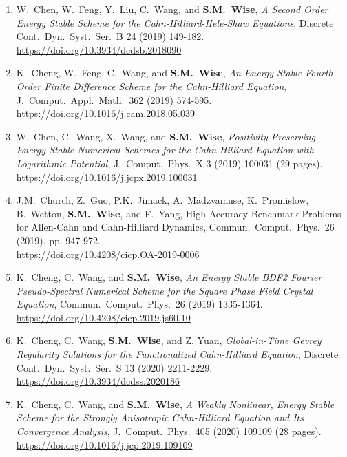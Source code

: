 \documentclass[11pt]{letter}
\begin{document}
\begin{enumerate}
	\item
W.~Chen, W.~Feng, Y.~Liu, C.~Wang, and \textbf{S.M.~Wise}, {\sl A Second Order Energy Stable Scheme for the Cahn-Hilliard-Hele-Shaw Equations}, Discrete Cont.~Dyn.~Syst.~Ser.~B 24 (2019) 149-182.
	\\ 
\url{https://doi.org/10.3934/dcdsb.2018090}

		\item
K.~Cheng, W.~Feng, C.~Wang, and \textbf{S.M.~Wise}, {\sl An Energy Stable Fourth Order Finite Difference Scheme for the Cahn-Hilliard Equation}, J.~Comput.~Appl.~Math.~362 (2019) 574-595.
	\\ 
\url{https://doi.org/10.1016/j.cam.2018.05.039}

    \item
W.~Chen, C.~Wang, X.~Wang, and \textbf{S.M.~Wise}, {\sl Positivity-Preserving, Energy Stable Numerical Schemes for the Cahn-Hilliard Equation with Logarithmic Potential}, J.~Comput.~Phys.~X 3 (2019) 100031 (29 pages).
	\\ 
\url{https://doi.org/10.1016/j.jcpx.2019.100031}

	\item
J.M.~Church, Z.~Guo, P.K.~Jimack, A.~Madzvamuse, K.~Promislow, B.~Wetton, \textbf{S.M.~Wise}, and F.~Yang, {High Accuracy Benchmark Problems for Allen-Cahn and Cahn-Hilliard Dynamics},  Commun.~Comput.~Phys.~26 (2019), pp. 947-972.
	\\ 
\url{https://doi.org/10.4208/cicp.OA-2019-0006}

	\item
K.~Cheng, C.~Wang, and \textbf{S.M.~Wise}, {\sl An Energy Stable BDF2 Fourier Pseudo-Spectral Numerical Scheme for the Square Phase Field Crystal Equation}, Commun.~Comput.~Phys.~26 (2019) 1335-1364.
	\\ 
\url{https://doi.org/10.4208/cicp.2019.js60.10}

	\item
K.~Cheng, C.~Wang, \textbf{S.M.~Wise}, and Z. Yuan, {\sl Global-in-Time Gevrey Regularity Solutions for the Functionalized Cahn-Hilliard Equation}, Discrete Cont.~Dyn.~Syst.~Ser.~S 13 (2020) 2211-2229.
	\\ 
\url{https://doi.org/10.3934/dcdss.2020186}

	\item
K.~Cheng, C.~Wang, and \textbf{S.M.~Wise}, {\sl A Weakly Nonlinear, Energy Stable Scheme for the Strongly Anisotropic Cahn-Hilliard Equation and Its Convergence Analysis}, J.~Comput.~Phys.~405 (2020) 109109 (28 pages).
	\\ 
\url{https://doi.org/10.1016/j.jcp.2019.109109}


\end{enumerate}
\end{document}
